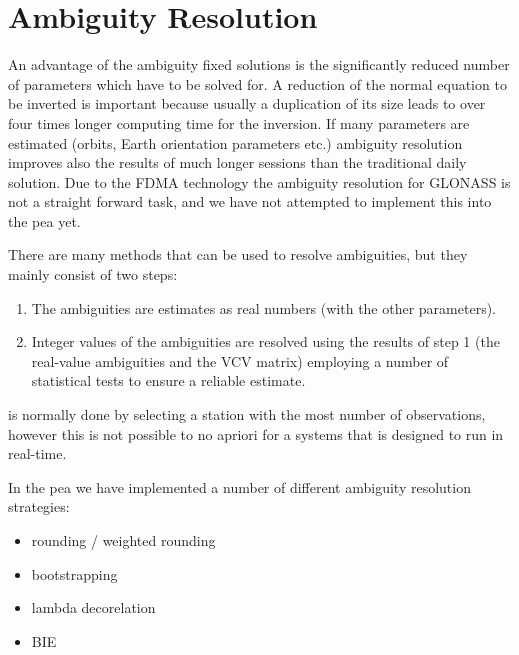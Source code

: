 \chapter{Ambiguity Resolution}
\label{ch:Ambiguity Resolution}

\begin{fullwidth}
An advantage of the ambiguity fixed solutions is the significantly reduced number of parameters which have to be solved for. A reduction of the normal equation to be inverted is important because usually a duplication of its size leads to over four times longer computing time for the inversion. If many parameters are estimated (orbits, Earth orientation parameters etc.) ambiguity resolution improves also the results of much longer sessions than the traditional daily solution.  
%
Due to the FDMA technology the ambiguity resolution for GLONASS is not a straight forward task, and we have not attempted to implement this into the pea yet.
\end{fullwidth}

There are many methods that can be used to resolve ambiguities, but they mainly consist of two steps:

\begin{enumerate}
    \item The ambiguities are estimates as real numbers (with the other parameters).
    \item Integer values of the ambiguities are resolved using the results of step 1 (the real-value ambiguities and the VCV matrix) employing a number of statistical tests to ensure a reliable estimate.
\end{enumerate}

\begin{fullwidth}
 is normally done by selecting a station with the most number of observations, however this is not possible to no apriori for a systems that is designed to run in real-time.\\
\end{fullwidth}
%
In the pea we have implemented a number of different ambiguity resolution strategies:
\begin{itemize}
    \item rounding / weighted rounding
    \item bootstrapping
    \item lambda decorelation
    \item BIE
\end{itemize}

